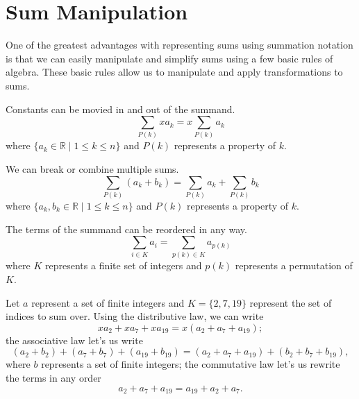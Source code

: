 \documentclass[prereq]{cslesson}
\numberwithin{equation}{section}
\begin{document}
\section{Sum Manipulation}
One of the greatest advantages with representing sums using summation notation is that we can easily manipulate and simplify sums using a few basic rules of algebra. These basic rules allow us to manipulate and apply transformations to sums.

\begin{definition}
Constants can be movied in and out of the summand.
\begin{equation*}
    \sum_{P(k)}xa_k=x\sum_{P(k)}a_k
\end{equation*}
where $\{a_k \in \mathbb{R} \mid 1 \leq k \leq n\}$ and $P(k)$ represents a property of $k$.
\end{definition}

\begin{definition}
We can break or combine multiple sums.
\begin{equation*}
    \sum_{P(k)}(a_k+b_k)=\sum_{P(k)}a_k+\sum_{P(k)}b_k
\end{equation*}
where $\{a_k, b_k \in \mathbb{R} \mid 1 \leq k \leq n\}$ and $P(k)$ represents a property of $k$.
\end{definition}

\begin{definition}
The terms of the summand can be reordered in any way.
\begin{equation*}
    \sum_{i \in K}a_i=\sum_{p(k) \in K}a_{p(k)}
\end{equation*}
where $K$ represents a finite set of integers and $p(k)$ represents a permutation of $K$.
\end{definition}

\begin{example}
Let $a$ represent a set of finite integers and $K=\{2,7,19\}$ represent the set of indices to sum over. Using the distributive law, we can write
\begin{equation*}
    xa_2+xa_7+xa_{19}=x(a_2+a_7+a_{19});
\end{equation*}
the associative law let's us write
\begin{equation*}
    (a_2+b_2)+(a_7+b_7)+(a_{19}+b_{19})=(a_2+a_7+a_{19})+(b_2+b_7+b_{19}),
\end{equation*}
where $b$ represents a set of finite integers; the commutative law let's us rewrite the terms in any order
\begin{equation*}
    a_2+a_7+a_{19}=a_{19}+a_2+a_7.
\end{equation*}
\end{example}
\end{document}
